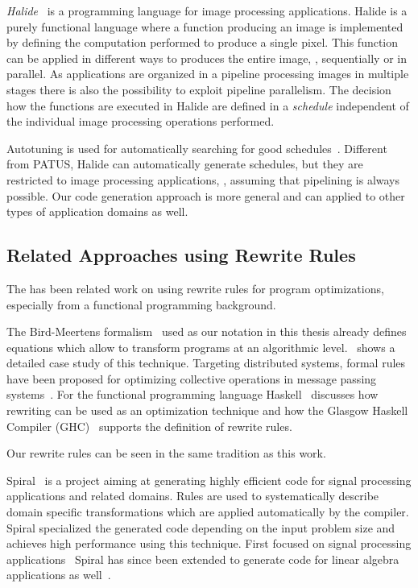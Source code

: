 \bigskip

\emph{Halide}~\cite{Ragan-KelleyAPLAD12,Ragan-KelleyBAPDA13} is a programming language for image processing applications.
Halide is a purely functional language where a function producing an image is implemented by defining the computation performed to produce a single pixel.
This function can be applied in different ways to produces the entire image, \eg, sequentially or in parallel.
As applications are organized in a pipeline processing images in multiple stages there is also the possibility to exploit pipeline parallelism.
The decision how the functions are executed in Halide are defined in a \emph{schedule} independent of the individual image processing operations performed.

Autotuning is used for automatically searching for good schedules~\cite{Ragan-KelleyBAPDA13}.
Different from {\small PATUS}, Halide can automatically generate schedules, but they are restricted to image processing applications, \eg, assuming that pipelining is always possible.
Our code generation approach is more general and can applied to other types of application domains as well.

\subsection{Related Approaches using Rewrite Rules}
The has been related work on using rewrite rules for program optimizations, especially from a functional programming background.

\bigskip

The Bird-Meertens formalism~\cite{Bird88} used as our notation in this thesis already defines equations which allow to transform programs at an algorithmic level.
\cite{Gorlatch96}~shows a detailed case study of this technique.
Targeting distributed systems, formal rules have been proposed for optimizing collective operations in message passing systems~\cite{GorlatchWL99,Gorlatch00,Gorlatch04}.
For the functional programming language Haskell \cite{JonesToHo2001}~discusses how rewriting can be used as an optimization technique and how the Glasgow Haskell Compiler ({\small GHC})~\cite{HudakHJW07} supports the definition of rewrite rules.

Our rewrite rules can be seen in the same tradition as this work.

\bigskip

Spiral~\cite{PuschelMSXJPVJ04,OfenbeckRSOP13,SpampinatoP14} is a project aiming at generating highly efficient code for signal processing applications and related domains.
Rules are used to systematically describe domain specific transformations which are applied automatically by the compiler.
Spiral specialized the generated code depending on the input problem size and achieves high performance using this technique.
First focused on signal processing applications~\cite{PuschelMSXJPVJ04} Spiral has since been extended to generate code for linear algebra applications as well~\cite{SpampinatoP14}.

